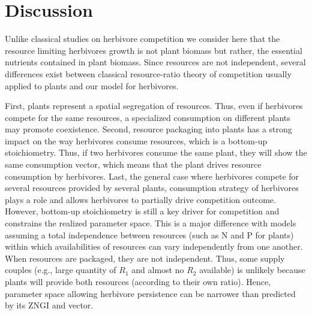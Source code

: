 \documentclass[12pt]{article}
\begin{document}
\section*{Discussion}
Unlike classical studies on herbivore competition we consider here that the resource limiting herbivores growth is not plant biomass but rather, the essential nutrients contained in plant biomass. 
Since resources are not independent, several differences exist between classical resource-ratio theory of competition usually applied to plants \citep{Tilman1980} and our model for herbivores.  %
\par
First, plants represent a spatial segregation of resources. Thus, even if herbivores compete for the same resources, a specialized consumption on different plants may promote coexistence. Second, resource packaging into plants has a strong impact on the way herbivores consume resources, which is a bottom-up stoichiometry. Thus, if two herbivores consume the same plant, they will show the same consumption vector, which means that the plant drives resource consumption by herbivores. 
Last, the general case where herbivores compete for several resources provided by several plants, consumption strategy of herbivores plays a role and allows herbivores to partially drive competition outcome. However, bottom-up stoichiometry is still a key driver for competition and constrains the realized parameter space. This is a major difference with models assuming a total independence between resources (such as N and P for plants) within which availabilities of resources can vary independently from one another. When resources are packaged, they are not independent. Thus, some supply couples (e.g., large quantity of $R_1$ and almost no $R_2$ available) is unlikely because plants will provide both resources (according to their own ratio). Hence, parameter space allowing herbivore persistence can be narrower than predicted by its ZNGI and vector.
\par
\end{document}
